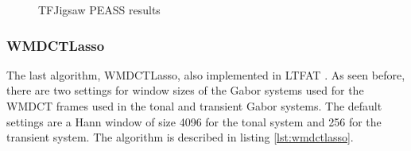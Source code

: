 \documentclass[letter,12pt]{article}
\begin{document}
\begin{figure}[ht]
	\centering
	\caption{TFJigsaw PEASS results}
	\label{fig:jigsaw}
\end{figure}

\vfill
\clearpage

\subsubsection{WMDCTLasso}

The last algorithm, WMDCTLasso\cite{wmdct}, also implemented in LTFAT \cite{wmdct3}. As seen before, there are two settings for window sizes of the Gabor systems used for the WMDCT frames used in the tonal and transient Gabor systems. The default settings are a Hann window of size 4096 for the tonal system and 256 for the transient system. The algorithm is described in listing \ref{lst:wmdctlasso}.
\end{document}
